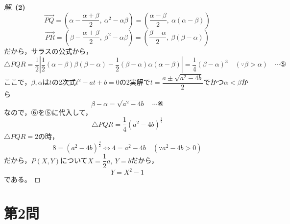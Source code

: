 \documentclass[../main.tex]{subfiles}
\begin{document}
\begin{proof}[解]
  \textbf{(2)}
  \[
    \overrightarrow{PQ}=\left(\alpha-\frac{\alpha+\beta}{2},\ \alpha^2-\alpha\beta\right)=\left(\frac{\alpha-\beta}{2},\ \alpha(\alpha-\beta)\right)
  \]
  \[
    \overrightarrow{PR}=\left(\beta-\frac{\alpha+\beta}{2},\ \beta^2-\alpha\beta\right)=\left(\frac{\beta-\alpha}{2},\ \beta(\beta-\alpha)\right)
  \]
  だから，サラスの公式から，
  \[
    \triangle PQR=\frac12\left|\frac12(\alpha-\beta)\beta(\beta-\alpha)-\frac12(\beta-\alpha)\alpha(\alpha-\beta)\right|=\frac14(\beta-\alpha)^3 \quad(\because\beta>\alpha) \quad\cdots\text{⑤}
  \]
  ここで，$\beta,\alpha$は$t$の2次式$t^2-at+b=0$の2実解で$t=\dfrac{a\pm\sqrt{a^2-4b}}{2}$でかつ$\alpha<\beta$から
  \[
    \beta-\alpha=\sqrt{a^2-4b} \quad\cdots\text{⑥}
  \]
  なので，⑥を⑤に代入して，
  \[
    \triangle PQR=\frac14(a^2-4b)^{\frac32}
  \]
  $\triangle PQR=2$の時，
  \[
    8=(a^2-4b)^{\frac32} \iff 4=a^2-4b \quad(\because a^2-4b>0)
  \]
  だから，$P(X,Y)$について$X=\dfrac12a,\ Y=b$だから，
  \[
    Y=X^2-1
  \]
  である。
\end{proof}

\newpage

\section*{第2問}
\end{document}
